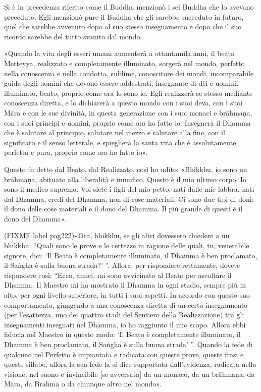  Si è in precedenza riferito come il Buddha menzionò i
sei Buddha che lo avevano preceduto. Egli menzionò pure il Buddha che
gli sarebbe succeduto in futuro, quel che sarebbe avvenuto dopo al suo
stesso insegnamento e dopo che il suo ricordo sarebbe del tutto svanito
dal mondo.


 «Quando la vita degli esseri umani aumenterà a ottantamila
anni, il beato Metteyya, realizzato e completamente illuminato, sorgerà
nel mondo, perfetto nella conoscenza e nella condotta, sublime,
conoscitore dei mondi, incomparabile guida degli uomini che devono
essere addestrati, insegnante di dèi e uomini, illuminato, beato,
proprio come ora lo sono io. Egli realizzerà se stesso mediante
conoscenza diretta, e lo dichiarerà a questo mondo con i suoi deva, con
i suoi Māra e con le sue divinità, in questa generazione con i suoi
monaci e brāhmaṇa, con i suoi principi e uomini, proprio come ora ho
fatto io. Insegnerà il Dhamma che è salutare al principio, salutare nel
mezzo e salutare alla fine, con il significato e il senso letterale, e
spiegherà la santa vita che è assolutamente perfetta e pura, proprio
come ora ho fatto io».




Questo fu detto dal Beato, dal Realizzato, così ho udito: «Bhikkhu, io
sono un brāhmaṇa, abituato alla liberalità e munifico. Questo è il mio
ultimo corpo. Io sono il medico supremo. Voi siete i figli del mio
petto, nati dalle mie labbra, nati dal Dhamma, eredi del Dhamma, non di
cose materiali. Ci sono due tipi di doni: il dono delle cose materiali e
il dono del Dhamma. Il più grande di questi è il dono del Dhamma».




(FIXME label pag222)«Ora, bhikkhu, se gli altri dovessero chiedere a un bhikkhu: “Quali sono
le prove e le certezze in ragione delle quali, tu, venerabile signore,
dici: ‘Il Beato è completamente illuminato, il Dhamma è ben proclamato,
il Saṅgha è sulla buona strada?’ ”. Allora, per rispondere rettamente,
dovete rispondere così: “Ecco, amici, mi sono avvicinato al Beato per
ascoltare il Dhamma. Il Maestro mi ha mostrato il Dhamma in ogni stadio,
sempre più in alto, per ogni livello superiore, in tutti i suoi aspetti.
In accordo con questo suo comportamento, giungendo a una conoscenza
diretta di un certo insegnamento (per l’esattezza, uno dei quattro stadi
del Sentiero della Realizzazione) tra gli insegnamenti insegnati nel
Dhamma, io ho raggiunto il mio scopo. Allora ebbi fiducia nel Maestro in
questo modo: ‘Il Beato è completamente illuminato, il Dhamma è ben
proclamato, il Saṅgha è sulla buona strada’ ”. Quando la fede di
qualcuno nel Perfetto è impiantata e radicata con queste prove, queste
frasi e queste sillabe, allora la sua fede la si dice supportata
dall’evidenza, radicata nella visione, nel suono e invincibile [se
avversata] da un monaco, da un brāhmaṇa, da Māra, da Brahmā o da
chiunque altro nel mondo».


